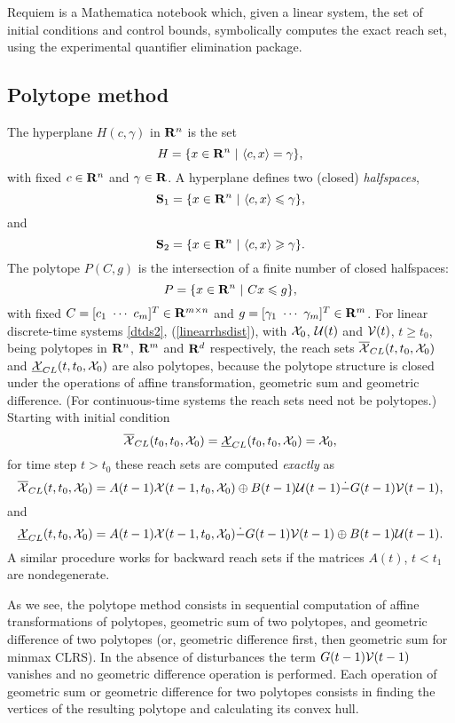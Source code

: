 Requiem \cite{requiem} is a Mathematica notebook which, given a linear system,
the set of initial conditions and control bounds, symbolically computes
the exact reach set, using the experimental quantifier elimination package.
















\subsection{Polytope method}\label{subsec_polytopes}
\bd[Hyperplane]
The hyperplane $H(c,\gamma)$ in ${\bf R}^n$ is the set
\[ H = \{x\in{\bf R}^n ~|~ \langle c, x\rangle = \gamma\} ,\]
with fixed $c\in{\bf R}^n$ and $\gamma\in{\bf R}$.
\label{def_hyperplane}
\ed
A hyperplane defines two (closed) {\it halfspaces},
\[ {\bf S}_1 = \{x\in{\bf R}^n ~|~ \langle c, x\rangle \leq \gamma\}, \]
and
\[ {\bf S}_2 = \{x\in{\bf R}^n ~|~ \langle c, x\rangle \geq \gamma\}. \]
\bd[Polytope]
The polytope $P(C,g)$ is the  intersection of a finite number
of closed halfspaces:
\[ P = \{x\in{\bf R}^n ~|~ Cx\leq g\}, \]
with fixed $C=[c_1 ~ \cdots ~ c_m]^T\in{\bf R}^{m\times n}$ and
$g=[\gamma_1 ~ \cdots ~ \gamma_m]^T\in{\bf R}^m$.
\label{def_polytope}
\ed
For linear discrete-time systems \ref{dtds2}, (\ref{linearrhsdist}),
with $\XX_0$, $\UU(t)$ and $\VV(t)$, $t\geq t_0$, being polytopes in
${\bf R}^n$, ${\bf R}^m$ and ${\bf R}^d$ respectively, the reach sets
$\OXCL(t, t_0, \XX_0)$ and $\UXCL(t, t_0, \XX_0)$ are also polytopes,
because the polytope structure is closed under the operations of affine
transformation, geometric sum and geometric difference.  (For continuous-time systems
the reach sets need not be polytopes.)
Starting with initial condition
\[ \OXCL(t_0, t_0, \XX_0) = \UXCL(t_0, t_0, \XX_0) = \XX_0, \]
for time step $t>t_0$ these reach sets are computed \emph{exactly} as
\[ \OXCL(t, t_0, \XX_0) = A(t-1)\XX(t-1, t_0, \XX_0) \oplus
B(t-1)\UU(t-1) \dot{-} G(t-1)\VV(t-1), \]
and
\[ \UXCL(t, t_0, \XX_0) = A(t-1)\XX(t-1, t_0, \XX_0) \dot{-}
G(t-1)\VV(t-1) \oplus B(t-1)\UU(t-1). \]
A similar procedure works for backward reach sets if the matrices $A(t)$, $t<t_1$
are nondegenerate.

As we see, the polytope method consists in sequential computation
of affine transformations of polytopes, geometric sum of two polytopes, and
geometric difference of two polytopes (or, geometric difference first,
then geometric sum for minmax CLRS).
In the absence of disturbances the term $G(t-1)\VV(t-1)$ vanishes and
no geometric difference operation is performed.
Each operation of geometric sum or geometric difference for two polytopes
consists in finding the vertices of the resulting
polytope and calculating its convex hull.

